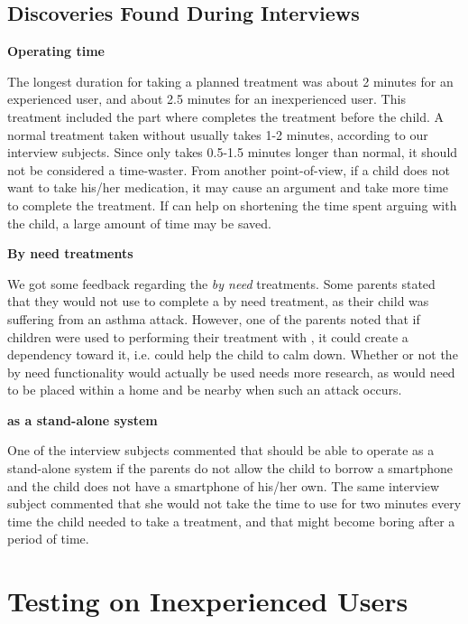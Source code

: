 \subsection{Discoveries Found During Interviews}

\textbf{Operating time}

The longest duration for taking a planned treatment was about 2 minutes for an experienced user, and about 2.5 minutes for an inexperienced user. This treatment included the part where \buddy{} completes the treatment before the child. A normal treatment taken without \ab{} usually takes 1-2 minutes, according to our interview subjects. Since \ab{} only takes 0.5-1.5 minutes longer than normal, it should not be considered a time-waster. From another point-of-view, if a child does not want to take his/her medication, it may cause an argument and take more time to complete the treatment. If \ab{} can help on shortening the time spent arguing with the child, a large amount of time may be saved.      

\textbf{By need treatments}

We got some feedback regarding the \emph{by need} treatments. Some parents stated that they would not use \buddy{} to complete a by need treatment, as their child was suffering from an asthma attack. However, one of the parents noted that if children were used to performing their treatment with \buddy{}, it could create a dependency toward it, i.e. \buddy{} could help the child to calm down. Whether or not the by need functionality would actually be used needs more research, as \buddy{} would need to be placed within a home and be nearby when such an attack occurs. 

\textbf{\ab{} as a stand-alone system}

One of the interview subjects commented that \ab{} should be able to operate as a stand-alone system if the parents do not allow the child to borrow a smartphone and the child does not have a smartphone of his/her own. The same interview subject commented that she would not take the time to use \ab{} for two minutes every time the child needed to take a treatment, and that \ab{} might become boring after a period of time.

\section{Testing \ab{} on Inexperienced Users}
\label{chp:interaction-methods}

